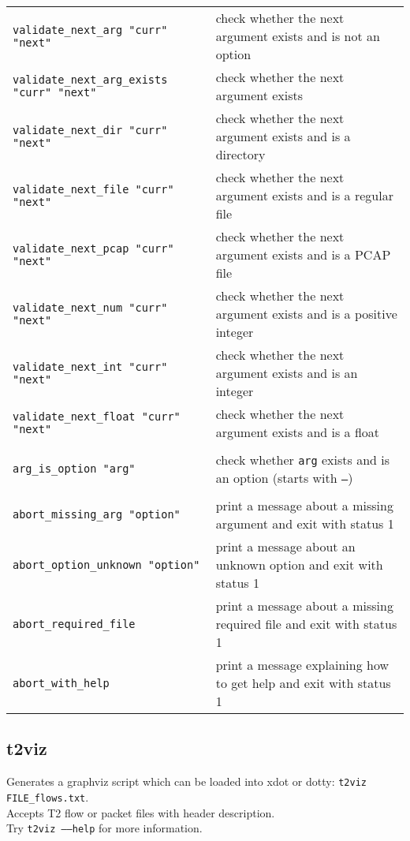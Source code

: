 \documentclass[documentation]{subfiles}
\begin{document}
\begin{longtable}{ll}
    {\tt validate\_next\_arg "curr" "next"}         & check whether the next argument exists and is not an option\\
    {\tt validate\_next\_arg\_exists "curr" "next"} & check whether the next argument exists\\
    {\tt validate\_next\_dir "curr" "next"}         & check whether the next argument exists and is a directory\\
    {\tt validate\_next\_file "curr" "next"}        & check whether the next argument exists and is a regular file\\
    {\tt validate\_next\_pcap "curr" "next"}        & check whether the next argument exists and is a PCAP file\\
    {\tt validate\_next\_num "curr" "next"}         & check whether the next argument exists and is a positive integer\\
    {\tt validate\_next\_int "curr" "next"}         & check whether the next argument exists and is an integer\\
    {\tt validate\_next\_float "curr" "next"}       & check whether the next argument exists and is a float\\\\

    {\tt arg\_is\_option "arg"}           & check whether {\tt arg} exists and is an option (starts with {\tt --})\\\\

    {\tt abort\_missing\_arg "option"}    & print a message about a missing argument and exit with status 1\\
    {\tt abort\_option\_unknown "option"} & print a message about an unknown option and exit with status 1\\
    {\tt abort\_required\_file}           & print a message about a missing required file and exit with status 1\\
    {\tt abort\_with\_help}               & print a message explaining how to get help and exit with status 1\\
    \bottomrule
\end{longtable}

\subsection{t2viz}\label{t2viz}
Generates a graphviz script which can be loaded into xdot or dotty: {\tt t2viz FILE\_flows.txt}.\\
\noindent Accepts T2 flow or packet files with header description.\\
\noindent Try {\tt t2viz --{}--help} for more information.
\end{document}
